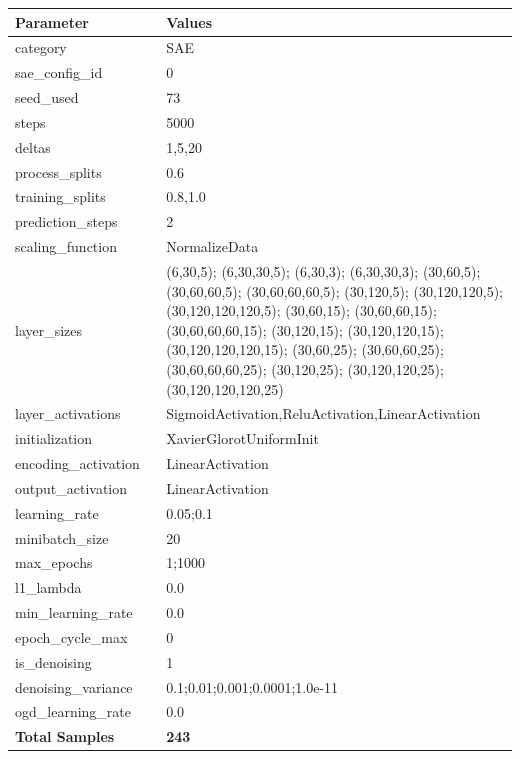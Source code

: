 \documentclass[a4paper,11pt,oneside]{article}
\theoremstyle{plain}
\theoremstyle{definition}
\begin{document}
	\begin{longtable}[H]{|p{0.3\linewidth}|p{0.7\linewidth}|} \hline \textbf{Parameter} &\textbf{Values} \\\hline{category} & {SAE} \\\hline
		{sae\_config\_id} & {0} \\\hline
		{seed\_used} & {73} \\\hline
		{steps} & {5000} \\\hline
		{deltas} & {1,5,20} \\\hline
		{process\_splits} & {0.6} \\\hline
		{training\_splits} & {0.8,1.0} \\\hline
		{prediction\_steps} & {2} \\\hline
		{scaling\_function} & {NormalizeData} \\\hline
		{layer\_sizes} & {(6,30,5); (6,30,30,5); (6,30,3); (6,30,30,3); (30,60,5); (30,60,60,5); (30,60,60,60,5); (30,120,5); (30,120,120,5); (30,120,120,120,5); (30,60,15); (30,60,60,15); (30,60,60,60,15); (30,120,15); (30,120,120,15); (30,120,120,120,15); (30,60,25); (30,60,60,25); (30,60,60,60,25); (30,120,25); (30,120,120,25); (30,120,120,120,25)} \\\hline
		{layer\_activations} & {SigmoidActivation,ReluActivation,LinearActivation} \\\hline
		{initialization} & {XavierGlorotUniformInit} \\\hline
		{encoding\_activation} & {LinearActivation} \\\hline
		{output\_activation} & {LinearActivation} \\\hline
		{learning\_rate} & {0.05;0.1} \\\hline
		{minibatch\_size} & {20} \\\hline
		{max\_epochs} & {1;1000} \\\hline
		{l1\_lambda} & {0.0} \\\hline
		{min\_learning\_rate} & {0.0} \\\hline
		{epoch\_cycle\_max} & {0} \\\hline
		{is\_denoising} & {1} \\\hline
		{denoising\_variance} & {0.1;0.01;0.001;0.0001;1.0e-11} \\\hline
		{ogd\_learning\_rate} & {0.0} \\\hline
		{\textbf{Total Samples}} & {\textbf{243}} \\\hline
	\end{longtable}
	
	\newpage
\end{document}
